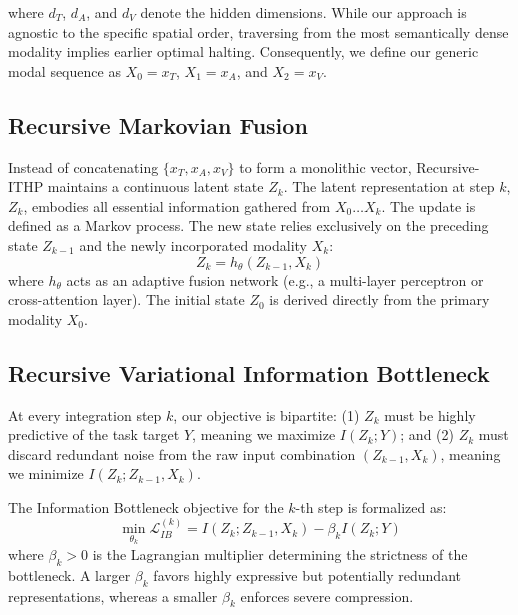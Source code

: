 \documentclass[11pt]{article}
\begin{document}
where $d_{T}$, $d_{A}$, and $d_{V}$ denote the hidden dimensions. While our approach is agnostic to the specific spatial order, traversing from the most semantically dense modality implies earlier optimal halting. Consequently, we define our generic modal sequence as $X_0 = x_T$, $X_1 = x_A$, and $X_2 = x_V$.

\subsection{Recursive Markovian Fusion}
Instead of concatenating $\{x_T, x_A, x_V\}$ to form a monolithic vector, Recursive-ITHP maintains a continuous latent state $Z_k$. The latent representation at step $k$, $Z_k$, embodies all essential information gathered from $X_0 \dots X_k$. 
The update is defined as a Markov process. The new state relies exclusively on the preceding state $Z_{k-1}$ and the newly incorporated modality $X_k$:
\begin{equation}
    Z_{k} = h_{\theta}(Z_{k-1}, X_k)
\end{equation}
where $h_{\theta}$ acts as an adaptive fusion network (e.g., a multi-layer perceptron or cross-attention layer). The initial state $Z_0$ is derived directly from the primary modality $X_0$.

\subsection{Recursive Variational Information Bottleneck}
At every integration step $k$, our objective is bipartite: (1) $Z_k$ must be highly predictive of the task target $Y$, meaning we maximize $I(Z_k; Y)$; and (2) $Z_k$ must discard redundant noise from the raw input combination $(Z_{k-1}, X_k)$, meaning we minimize $I(Z_k; Z_{k-1}, X_k)$.

The Information Bottleneck objective for the $k$-th step is formalized as:
\begin{equation}
\label{eq:ib_k}
    \min_{\theta_k} \mathcal{L}_{IB}^{(k)} = I(Z_k ; Z_{k-1}, X_k) - \beta_k I(Z_k ; Y)
\end{equation}
where $\beta_k > 0$ is the Lagrangian multiplier determining the strictness of the bottleneck. A larger $\beta_k$ favors highly expressive but potentially redundant representations, whereas a smaller $\beta_k$ enforces severe compression.
\end{document}
